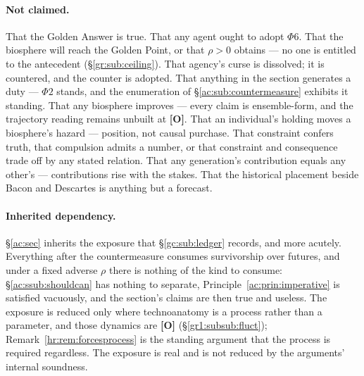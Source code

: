 \documentclass[11pt]{article}
\numberwithin{equation}{section}
\theoremstyle{plain}
\theoremstyle{definition}
\theoremstyle{remark}
\begin{document}
\paragraph{Not claimed.} That the Golden Answer is true. That any agent ought to adopt $\Phi6$. That the biosphere will reach the Golden Point, or that $\rho > 0$ obtains --- no one is entitled to the antecedent (\S\ref{gr:sub:ceiling}). That agency's curse is dissolved; it is countered, and the counter is adopted. That anything in the section generates a duty --- $\Phi2$ stands, and the enumeration of \S\ref{ac:sub:countermeasure} exhibits it standing. That any biosphere improves --- every claim is ensemble-form, and the trajectory reading remains unbuilt at \textbf{[O]}. That an individual's holding moves a biosphere's hazard --- position, not causal purchase. That constraint confers truth, that compulsion admits a number, or that constraint and consequence trade off by any stated relation. That any generation's contribution equals any other's --- contributions rise with the stakes. That the historical placement beside Bacon and Descartes is anything but a forecast.

\paragraph{Inherited dependency.} \S\ref{ac:sec} inherits the exposure that \S\ref{gc:sub:ledger} records, and more acutely. Everything after the countermeasure consumes survivorship over futures, and under a fixed adverse $\rho$ there is nothing of the kind to consume: \S\ref{ac:ssub:shouldcan} has nothing to separate, Principle~\ref{ac:prin:imperative} is satisfied vacuously, and the section's claims are then true and useless. The exposure is reduced only where technoanatomy is a process rather than a parameter, and those dynamics are \textbf{[O]} (\S\ref{gr1:subsub:fluct}); Remark~\ref{hr:rem:forcesprocess} is the standing argument that the process is required regardless. The exposure is real and is not reduced by the arguments' internal soundness.
\end{document}
